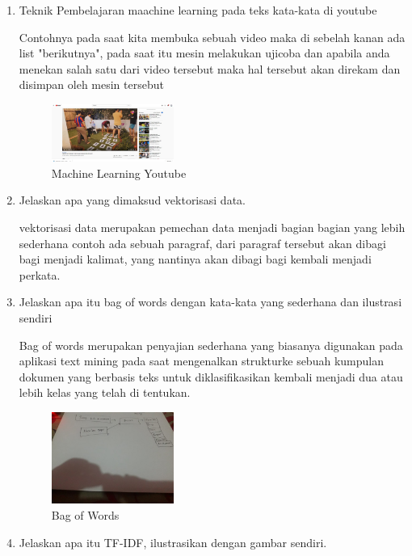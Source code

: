 \begin{enumerate}
        \item Teknik Pembelajaran maachine learning pada teks kata-kata di youtube
        
        Contohnya pada saat kita membuka sebuah video maka di sebelah kanan ada list "berikutnya", pada saat itu mesin melakukan ujicoba dan apabila anda menekan salah satu dari video tersebut maka hal tersebut akan direkam dan disimpan oleh mesin tersebut

        \begin{figure}[H]
            \includegraphics[width=4cm]{figures/1174026/4/youtube.jpg}
            \centering
            \caption{Machine Learning Youtube}
        \end{figure}

        \item Jelaskan apa yang dimaksud vektorisasi data.
        
        vektorisasi data merupakan pemechan data menjadi bagian bagian yang lebih sederhana contoh ada sebuah paragraf, dari paragraf tersebut akan dibagi bagi menjadi kalimat, yang nantinya akan dibagi bagi kembali menjadi perkata.

        \item Jelaskan apa itu bag of words dengan kata-kata yang sederhana dan ilustrasi sendiri
        
        Bag of words merupakan penyajian sederhana yang biasanya digunakan pada aplikasi text mining pada saat mengenalkan strukturke sebuah kumpulan dokumen yang berbasis teks untuk diklasifikasikan kembali menjadi dua atau lebih kelas yang telah di tentukan.

        \begin{figure}[H]
            \includegraphics[width=4cm]{figures/1174026/4/box.jpeg}
            \centering
            \caption{Bag of Words}
        \end{figure}

        \item Jelaskan apa itu TF-IDF, ilustrasikan dengan gambar sendiri.
        

\end{enumerate}
